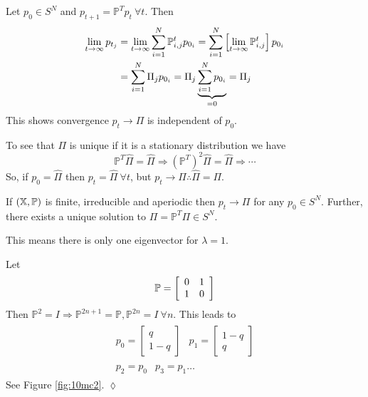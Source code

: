 Let $p_0\in S^N$ and $p_{t+1}=\mathbb{P}^Tp_t ~\forall t$. Then
\begin{align*}
\lim_{t\to\infty}p_{t_j} &= \lim_{t\to\infty}\sum_{i=1}^N\mathbb{P}_{i,j}^tp_{0_i} = \sum_{i=1}^N\left[\lim_{t\to\infty}\mathbb{P}_{i,j}^t\right]p_{0_i} \\
&= \sum_{i=1}^N\Pi_jp_{0_i} = \Pi_j\underbrace{\sum_{i=1}^Np_{0_i}}_{=0} = \Pi_j
\end{align*}
This shows convergence $p_t\rightarrow\Pi$ is independent of $p_0$.

To see that $\Pi$ is unique if it is a stationary distribution we have
$$\mathbb{P}^T\hat{\Pi} = \hat{\Pi} \Rightarrow (\mathbb{P}^T)^2\hat{\Pi} = \hat{\Pi} \Rightarrow \cdots$$
So, if $p_0=\hat{\Pi}$ then $p_t=\hat{\Pi} ~\forall t$, but $p_t\rightarrow\Pi \therefore \hat{\Pi}=\Pi$.

\begin{corollary}
If $(\mathbb{X},\mathbb{P})$ is finite, irreducible and aperiodic then $p_t\rightarrow\Pi$ for any $p_0\in S^N$. Further, there exists a unique solution to $\Pi=\mathbb{P}^T\Pi \in S^N$.
\end{corollary}
This means there is only one eigenvector for $\lambda=1$.

\begin{example}
Let
$$\mathbb{P} = \left[\begin{array}{c c} 0 & 1 \\ 1 & 0 \end{array}\right]$$
Then $\mathbb{P}^2=I \Rightarrow \mathbb{P}^{2n+1}=\mathbb{P}, \mathbb{P}^{2n}=I ~\forall n$. This leads to
\begin{align*}
\begin{split}
p_0 = \left[\begin{array}{c} q \\ 1-q \end{array}\right]
\end{split}
\begin{split}
p_1 = \left[\begin{array}{c} 1-q \\ q \end{array}\right]
\end{split} \\
\begin{split}
p_2=p_0
\end{split}
\begin{split}
p_3=p_1\ldots
\end{split}
\end{align*}
See Figure \ref{fig:10mc2}.
$\lozenge$
\end{example}

